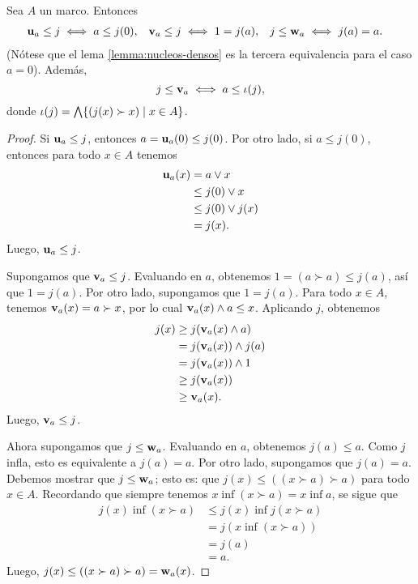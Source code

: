 \begin{lemma}[Equivalencias]
  \label{lemma:equivalencias}
  Sea $A$ un marco.
  Entonces
  \begin{align*}
    \mathbf u_{a}\leq j &\iff a\leq j(0), &
    \mathbf v_{a}\leq j &\iff 1=j(a), &
    j\leq \mathbf w_{a} &\iff j(a)=a.
  \end{align*}
  (Nótese que el lema \ref{lemma:nucleos-densos}
  es la tercera equivalencia para el caso $a=0$).
  Además,
  \begin{equation}
    j\leq \mathbf v_{a} \iff a\leq\iota(j)
  ,\end{equation}
  donde $\iota(j)=\bigwedge\{(j(x)\succ x)\mid x\in A\}$.
\end{lemma}
\begin{proof}
    Si $\mathbf u_{a} \leq j$, entonces
    $a=\mathbf u_{a}(0) \leq j(0)$.
    Por otro lado, si $a\leq j(0)$, entonces para todo $x\in A$
    tenemos
    \begin{align*}
      \mathbf u_{a} (x)
      &= a\vee x \\
      &\leq j(0) \vee x \\
      &\leq j(0) \vee j(x) \\
      &= j(x).
    \end{align*}
    Luego, $\mathbf u_{a} \leq j$.
    
    Supongamos que $\mathbf v_{a}\leq j$.
    Evaluando en $a$, obtenemos $1=(a\succ a)\leq j(a)$,
    así que $1=j(a)$.
    Por otro lado, supongamos que $1=j(a)$.
    Para todo $x\in A$, tenemos $\mathbf v_{a}(x)=a\succ x$,
    por lo cual $\mathbf v_{a}(x)\wedge a\leq x$.
    Aplicando $j$, obtenemos
    \begin{align*}
        j(x)
        &\geq j(\mathbf v_{a}(x)\wedge a) \\
        &= j(\mathbf v_{a}(x))\wedge j(a) \\
        &= j(\mathbf v_{a}(x))\wedge 1 \\
        &\geq j(\mathbf v_{a}(x)) \\
        &\geq \mathbf v_{a}(x).
    \end{align*}
    Luego, $\mathbf v_{a}\leq j$.
    
    Ahora supongamos que $j\leq\mathbf w_{a}$.
    Evaluando en $a$, obtenemos $j(a)\leq a$.
    Como $j$ infla, esto es equivalente a $j(a)=a$.
    Por otro lado, supongamos que $j(a)=a$.
    Debemos mostrar que $j\leq\mathbf w_{a}$;
    esto es: que $j(x)\leq((x\succ a)\succ a)$
    para todo $x\in A$.
    Recordando que siempre tenemos $x\inf(x\succ a)=x\inf a$,
    se sigue que
    \begin{align*}
        j(x)\inf(x\succ a)
        &\leq j(x)\inf j(x\succ a) \\
        &= j(x\inf (x\succ a)) \\
        &= j(a) \\
        &= a.
    \end{align*}
    Luego, $j(x)\leq((x\succ a)\succ a)=\mathbf w_{a}(x)$.


\end{proof}
